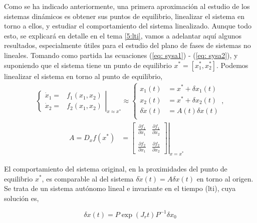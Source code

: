  Como se ha indicado anteriormente, una primera aproximación al estudio de los sistemas dinámicos es obtener sus puntos de equilibrio, linealizar el sistema en torno a ellos, y estudiar el comportamiento del sistema linealizado. Aunque todo esto, se explicará en detalle en el tema \ref{5:lti}, vamos a adelantar aquí algunos resultados, especialmente útiles para el estudio del plano de fases de sistemas no lineales. 
Tomando como partida las ecuaciones (\ref{eq: sysa1}) - (\ref{eq: sysa2}), y suponiendo que el sistema tiene un punto de equilibrio $x^*= [x_1^*,x_2^*]$. Podemos linealizar el sistema en torno al punto de equilibrio,
\begin{align}
\left.\begin{cases}
	\dot x_1 =& f_1(x_1,x_2) \\ \dot x_2 =& f_2(x_1,x_2)
	\end{cases}\right|_{x\approx x^*} \approx
	\begin{cases}
		x_1(t) &= x^* + \delta x_1(t) \\
		x_2(t) &= x^* + \delta x_2(t) \\
	\delta \dot x(t) &= A(t)\delta x(t)  \\
	\end{cases},
\end{align}
\begin{align}\label{eq:A}
	A = D_xf(x^*) &= \left. \begin{bmatrix}
		\frac{\partial f_1}{\partial x_1} &  \frac{\partial f_1}{\partial x_2} \\
		\ \\
		\frac{\partial f_2}{\partial x_1} & \frac{\partial f_2}{\partial x_2}
	\end{bmatrix} \right |_{x=x^*} \quad
\end{align}

El comportamiento del sistema original, en la proximidades del punto de equilibrio $x^*$, es comparable al del sistema $\delta \dot x(t) = A\delta x(t)$ en torno al origen. Se trata de un sistema autónomo lineal e invariante en el tiempo (lti), cuya solución es,

\begin{equation}
\delta x(t) = P\exp(J_rt)P^{-1}\delta x_0 
\end{equation}

